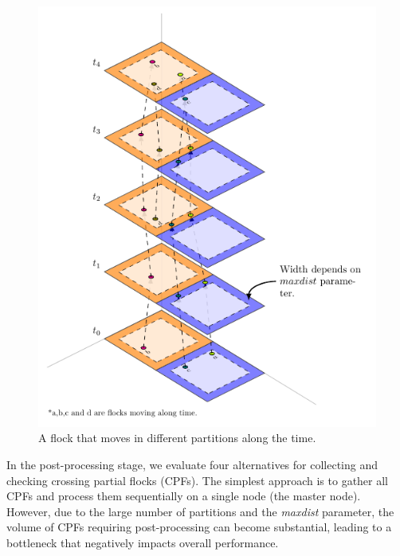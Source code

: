 \begin{figure}
    \centering
    \includegraphics[height=0.9\textheight]
    {chapterPFlocks/figures/plots/11_temporal_partitions/TemporalPartitioning.pdf}
    \caption{A flock that moves in different partitions along the time.}\label{fig:simple_alternative}
\end{figure}

In the post-processing stage, we evaluate four alternatives for collecting and checking crossing partial flocks (CPFs). The simplest approach is to gather all CPFs and process them sequentially on a single node (the master node). However, due to the large number of partitions and the \textit{maxdist} parameter, the volume of CPFs requiring post-processing can become substantial, leading to a bottleneck that negatively impacts overall performance.

